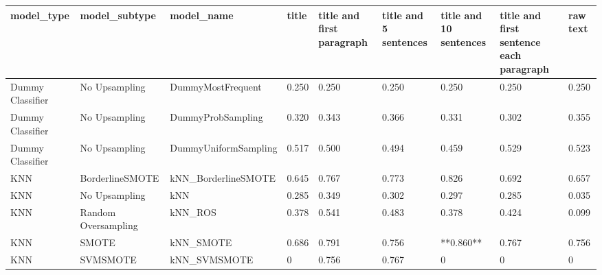 \begin{tabular}{lllllllll}
\toprule
                  model\_type &       model\_subtype &                                   model\_name & title & title and first paragraph & title and 5 sentences & title and 10 sentences & title and first sentence each paragraph & raw text \\
\midrule
            Dummy Classifier &       No Upsampling &                            DummyMostFrequent & 0.250 &                     0.250 &                 0.250 &                  0.250 &                                   0.250 &    0.250 \\
            Dummy Classifier &       No Upsampling &                            DummyProbSampling & 0.320 &                     0.343 &                 0.366 &                  0.331 &                                   0.302 &    0.355 \\
            Dummy Classifier &       No Upsampling &                         DummyUniformSampling & 0.517 &                     0.500 &                 0.494 &                  0.459 &                                   0.529 &    0.523 \\
                         KNN &     BorderlineSMOTE &                          kNN\_BorderlineSMOTE & 0.645 &                     0.767 &                 0.773 &                  0.826 &                                   0.692 &    0.657 \\
                         KNN &       No Upsampling &                                          kNN & 0.285 &                     0.349 &                 0.302 &                  0.297 &                                   0.285 &    0.035 \\
                         KNN & Random Oversampling &                                      kNN\_ROS & 0.378 &                     0.541 &                 0.483 &                  0.378 &                                   0.424 &    0.099 \\
                         KNN &               SMOTE &                                    kNN\_SMOTE & 0.686 &                     0.791 &                 0.756 &              **0.860** &                                   0.767 &    0.756 \\
                         KNN &            SVMSMOTE &                                 kNN\_SVMSMOTE &     0 &                     0.756 &                 0.767 &                      0 &                                       0 &        0 \\

\end{tabular}
